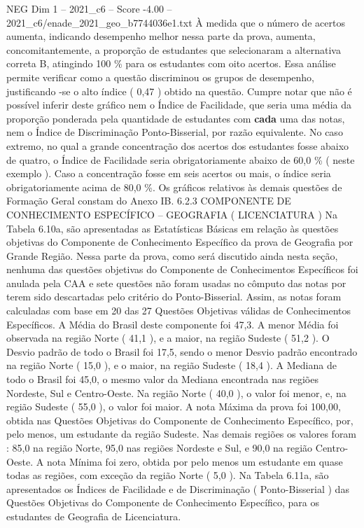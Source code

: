 \begin{textsample}{NEG Dim 1 – 2021\_c6 – Score -4.00 – 2021\_c6/enade\_2021\_geo\_b7744036e1.txt}
À medida que o número de acertos aumenta, indicando desempenho melhor nessa parte da prova, aumenta, concomitantemente, a proporção de estudantes que selecionaram a alternativa correta B, atingindo 100 \% para os estudantes com oito acertos.
Essa análise permite verificar como a questão discriminou os grupos de desempenho, justificando -se o alto índice ( 0,47 ) obtido na questão.
Cumpre notar que não é possível inferir deste gráfico nem o Índice de Facilidade, que seria uma média da proporção ponderada pela quantidade de estudantes com \textbf{cada} uma das notas, nem o Índice de Discriminação Ponto-Bisserial, por razão equivalente.
No caso extremo, no qual a grande concentração dos acertos dos estudantes fosse abaixo de quatro, o Índice de Facilidade seria obrigatoriamente abaixo de 60,0 \% ( neste exemplo ).
Caso a concentração fosse em seis acertos ou mais, o índice seria obrigatoriamente acima de 80,0 \%.
Os gráficos relativos às demais questões de Formação Geral constam do Anexo IB. 6.2.3 COMPONENTE DE CONHECIMENTO ESPECÍFICO – GEOGRAFIA ( LICENCIATURA ) Na Tabela 6.10a, são apresentadas as Estatísticas Básicas em relação às questões objetivas do Componente de Conhecimento Específico da prova de Geografia por Grande Região.
Nessa parte da prova, como será discutido ainda nesta seção, nenhuma das questões objetivas do Componente de Conhecimentos Específicos foi anulada pela CAA e sete questões não foram usadas no cômputo das notas por terem sido descartadas pelo critério do Ponto-Bisserial.
Assim, as notas foram calculadas com base em 20 das 27 Questões Objetivas válidas de Conhecimentos Específicos.
A Média do Brasil deste componente foi 47,3.
A menor Média foi observada na região Norte ( 41,1 ), e a maior, na região Sudeste ( 51,2 ).
O Desvio padrão de todo o Brasil foi 17,5, sendo o menor Desvio padrão encontrado na região Norte ( 15,0 ), e o maior, na região Sudeste ( 18,4 ).
A Mediana de todo o Brasil foi 45,0, o mesmo valor da Mediana encontrada nas regiões Nordeste, Sul e Centro-Oeste.
Na região Norte ( 40,0 ), o valor foi menor, e, na região Sudeste ( 55,0 ), o valor foi maior.
A nota Máxima da prova foi 100,00, obtida nas Questões Objetivas do Componente de Conhecimento Específico, por, pelo menos, um estudante da região Sudeste.
Nas demais regiões os valores foram : 85,0 na região Norte, 95,0 nas regiões Nordeste e Sul, e 90,0 na região Centro-Oeste.
A nota Mínima foi zero, obtida por pelo menos um estudante em quase todas as regiões, com exceção da região Norte ( 5,0 ).
Na Tabela 6.11a, são apresentados os Índices de Facilidade e de Discriminação ( Ponto-Bisserial ) das Questões Objetivas do Componente de Conhecimento Específico, para os estudantes de Geografia de Licenciatura.

\end{textsample}
